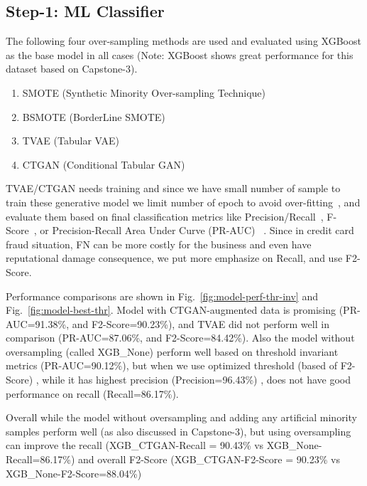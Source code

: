 \documentclass[stu, 12pt, floatsintext]{apa7}
\begin{document}
\subsection{Step-1: ML Classifier}
The following four over-sampling methods are used and evaluated using XGBoost as the base model in all cases (Note: XGBoost shows great performance for this dataset based on Capstone-3).
\begin{enumerate}[font=\large\color{red}]
	\item SMOTE (Synthetic Minority Over-sampling Technique)~\parencites{smote}{imb-learn}{imb-learn-doc}
	\item BSMOTE (BorderLine SMOTE)~\parencites{bsmote}{imb-learn}{imb-learn-doc}
	\item TVAE (Tabular VAE)~\parencites{org-ctgan-tvae}{sdv-paper}{sdv-git}
	\item CTGAN (Conditional Tabular GAN)~\parencites{org-ctgan-tvae}{sdv-paper}{sdv-git}
\end{enumerate}
TVAE/CTGAN needs training and since we have small number of sample to train these generative model we limit number of epoch to avoid over-fitting~\parencite{enwiki:overfitting}, and evaluate them based on final classification metrics like Precision/Recall~\parencite{enwiki:clf-metrics}, F-Score~\parencite{enwiki:f-score}, or Precision-Recall Area Under Curve (PR-AUC)~\parencite{mlm:pr-auc} .  Since  in credit card fraud  situation, FN can be more costly for the business and even have reputational damage consequence, we put more emphasize on Recall, and use F2-Score.

Performance comparisons are shown in Fig.~\ref{fig:model-perf-thr-inv} and Fig.~\ref{fig:model-best-thr}.  Model with CTGAN-augmented data is promising (PR-AUC=91.38\%, and F2-Score=90.23\%), and TVAE did not perform well in comparison (PR-AUC=87.06\%, and F2-Score=84.42\%). Also the model without oversampling (called XGB\_None) perform well based  on threshold invariant  metrics (PR-AUC=90.12\%), but when we use optimized threshold (based of F2-Score) , while it has highest precision (Precision=96.43\%) , does not have good  performance on recall (Recall=86.17\%).

Overall while the model without oversampling and adding any artificial minority samples perform well (as also discussed in Capstone-3), but using oversampling can improve the recall (XGB\_CTGAN-Recall = 90.43\% vs XGB\_None-Recall=86.17\%) and  overall F2-Score (XGB\_CTGAN-F2-Score = 90.23\% vs XGB\_None-F2-Score=88.04\%)
\end{document}
